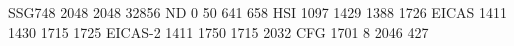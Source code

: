 SSG748 2048 2048 32856
ND         0   50  641  658
HSI     1097 1429 1388 1726
EICAS   1411 1430 1715 1725
EICAS-2 1411 1750 1715 2032
CFG     1701    8 2046  427
